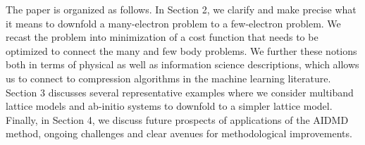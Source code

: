The paper is organized as follows. In Section 2, we clarify and make precise what it means to downfold 
a many-electron problem to a few-electron problem. We recast the problem into minimization 
of a cost function that needs to be optimized to connect the many and few body problems. We further 
these notions both in terms of physical as well as information science descriptions, which allows us to connect to 
compression algorithms in the machine learning literature. 
Section 3 discusses several representative examples where we consider multiband lattice models 
and ab-initio systems to downfold to a simpler lattice model. 
Finally, in Section 4, we discuss future prospects of applications of the AIDMD method, ongoing challenges 
and clear avenues for methodological improvements. 


